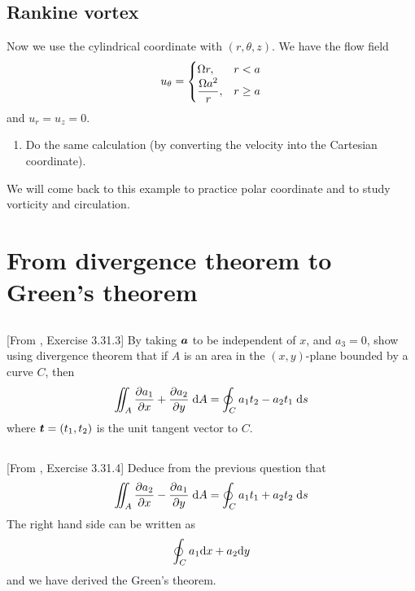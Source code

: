 \documentclass[11pt,letterpaper]{article}
\begin{document}
\subsection{Rankine vortex}
Now we use the cylindrical coordinate with $(r,\theta,z)$. We have the flow field
\begin{align}
    u_\theta = \begin{cases}
        \Omega r, & r<a\\
        \displaystyle{\frac{\Omega a^2}{r}}, & r\geq a
    \end{cases}
\end{align}
and $u_r = u_z = 0$. 
\begin{enumerate}
    \item Do the same calculation (by converting the velocity into the Cartesian coordinate).
\end{enumerate}
We will come back to this example to practice polar coordinate and to study vorticity and circulation.  

\section{From divergence theorem to Green's theorem}
\subsection{}
[From \cite{Aris_62}, Exercise 3.31.3] By taking $\boldsymbol{a}$ to be independent of $x$, and $a_3 = 0$, show using divergence theorem that if $A$ is an area in the $(x,y)$-plane bounded by a curve $C$, then
\begin{align}
    \iint_A \frac{\partial a_1}{\partial x}+\frac{\partial a_2}{\partial y}\;\mathrm{d} A = \oint_C a_1t_2-a_2t_1\;\mathrm{d} s
\end{align}
where $\boldsymbol{t}=(t_1,t_2)$ is the unit tangent vector to $C$. 

\subsection{}
[From \cite{Aris_62}, Exercise 3.31.4] Deduce from the previous question that
\begin{align}
    \iint_A \frac{\partial a_2}{\partial x}-\frac{\partial a_1}{\partial y}\;\mathrm{d} A = \oint_C a_1t_1+a_2t_2\;\mathrm{d} s
\end{align}
The right hand side can be written as
\begin{align}
    \oint_C a_1\mathrm{d} x+a_2\mathrm{d} y
\end{align}
and we have derived the Green's theorem.
\end{document}
